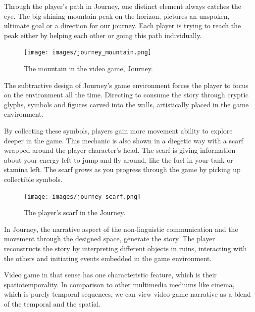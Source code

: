             Through the player's path in Journey, one distinct element always catches the eye. The big shining mountain peak on the horizon, pictures an unspoken, ultimate goal or a direction for our journey. Each player is trying to reach the peak either by helping each other or going this path individually.\par

            \begin{figure}[H]
                \centering
                \texttt{[image: images/journey\_mountain.png]}
                \caption{The mountain in the video game, Journey.}
                \label{fig:JOURNEY_MOUNTAIN}
            \end{figure}

            The subtractive design of Journey's game environment forces the player to focus on the environment all the time. Directing to consume the story through cryptic glyphs, symbols and figures carved into the walls, artistically placed in the game environment.\par

            By collecting these symbols, players gain more movement ability to explore deeper in the game. This mechanic is also shown in a diegetic way with a scarf wrapped around the player character's head. The scarf is giving information about your energy left to jump and fly around, like the fuel in your tank or stamina left. The scarf grows as you progress through the game by picking up collectible symbols.\par

            \begin{figure}[H]
                \centering
                \texttt{[image: images/journey\_scarf.png]}
                \caption{The player's scarf in the Journey.}
                \label{fig:JOURNEY_SCARF}
            \end{figure}      

            In Journey, the narrative aspect of the non-linguistic communication and the movement through the designed space, generate the story. The player reconstructs the story by interpreting different objects in ruins, interacting with the others and initiating events embedded in the game environment.\par

            Video game in that sense has one characteristic feature, which is their spatiotemporality. In comparison to other multimedia mediums like cinema, which is purely temporal sequences, we can view video game narrative as a blend of the temporal and the spatial\cite{Liminal_Space_Between_Embedded_and_Emergent_Narrative}.
